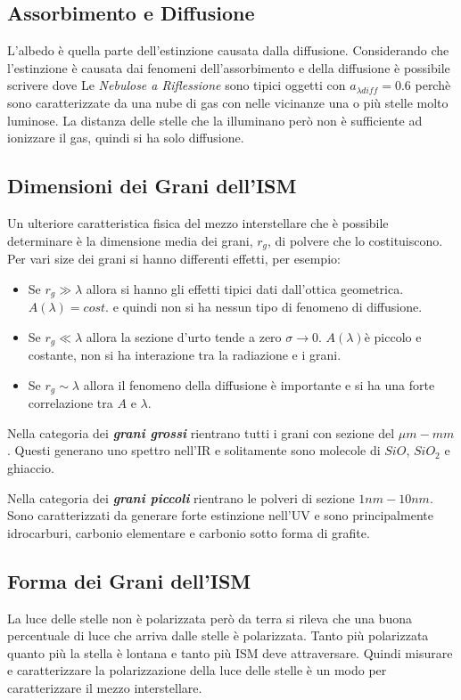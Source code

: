\subsection{Assorbimento e Diffusione}
L'albedo \`e quella parte dell'estinzione causata dalla diffusione. Considerando che l'estinzione \`e causata dai fenomeni dell'assorbimento e della diffusione \`e possibile scrivere
dove
Le \emph{Nebulose a Riflessione} sono tipici oggetti con $a_{\lambda diff}=0.6$ perch\`e sono caratterizzate da una nube di gas con nelle vicinanze una o pi\`u stelle molto luminose. La distanza delle stelle che la illuminano per\`o non \`e sufficiente ad ionizzare il gas, quindi si ha solo diffusione.\subsection{Dimensioni dei Grani dell'ISM}
Un ulteriore caratteristica fisica del mezzo interstellare che \`e possibile determinare \`e la dimensione media dei grani, $r_g$, di polvere che lo costituiscono. Per vari size dei grani si hanno differenti effetti, per esempio:
\begin{itemize}
		\item Se $r_g \gg \lambda$ allora si hanno gli effetti tipici dati dall'ottica geometrica. $A(\lambda) = cost.$ e quindi non si ha nessun tipo di fenomeno di diffusione.
		\item Se $r_g \ll \lambda$ allora la sezione d'urto tende a zero $\sigma \to 0$. $A(\lambda)$\`e piccolo e costante, non si ha interazione tra la radiazione e i grani.
		\item Se $r_g \sim \lambda$ allora il fenomeno della diffusione \`e importante e si ha una forte correlazione tra $A$ e $\lambda$.
\end{itemize}

Nella categoria dei \textbf{\emph{grani grossi}} rientrano tutti i grani con sezione del $\mu m - mm$. Questi generano uno spettro nell'IR e solitamente sono molecole di $SiO$, $SiO_2$ e ghiaccio.

Nella categoria dei \textbf{\emph{grani piccoli}} rientrano le polveri di sezione $1nm-10nm$. Sono caratterizzati da generare forte estinzione nell'UV e sono principalmente idrocarburi, carbonio elementare e carbonio sotto forma di grafite.
\subsection{Forma dei Grani dell'ISM}
La luce delle stelle non \`e polarizzata per\`o da terra si rileva che una buona percentuale di luce che arriva dalle stelle \`e polarizzata. Tanto pi\`u polarizzata quanto pi\`u la stella \`e lontana e tanto pi\`u ISM deve attraversare. Quindi misurare e caratterizzare la polarizzazione della luce delle stelle \`e un modo per caratterizzare il mezzo interstellare.

